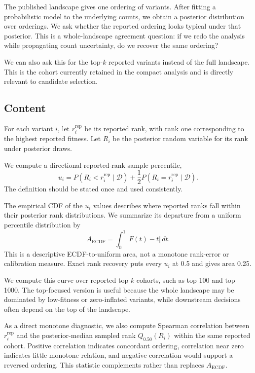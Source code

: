 \documentclass[11pt]{article}
\newcommand{\data}{\mathcal{D}}
\begin{document}
The published landscape gives one ordering of variants. After fitting a probabilistic model to the underlying counts, we obtain a posterior distribution over orderings. We ask whether the reported ordering looks typical under that posterior. This is a whole-landscape agreement question: if we redo the analysis while propagating count uncertainty, do we recover the same ordering?

We can also ask this for the top-$k$ reported variants instead of the full landscape. This is the cohort currently retained in the compact analysis and is directly relevant to candidate selection.

\subsection*{Content}

For each variant $i$, let $r_i^{\mathrm{rep}}$ be its reported rank, with rank one corresponding to the highest reported fitness. Let $R_i$ be the posterior random variable for its rank under posterior draws.

We compute a directional reported-rank sample percentile,
\[
u_i = P(R_i < r_i^{\mathrm{rep}} \mid \data)
+ \frac{1}{2}P(R_i = r_i^{\mathrm{rep}} \mid \data).
\]
The definition should be stated once and used consistently.

The empirical CDF of the $u_i$ values describes where reported ranks fall within their posterior rank distributions. We summarize its departure from a uniform percentile distribution by
\[
A_{\mathrm{ECDF}} =
\int_0^1 |F(t)-t|\,dt.
\]
This is a descriptive ECDF-to-uniform area, not a monotone rank-error or calibration measure. Exact rank recovery puts every $u_i$ at 0.5 and gives area 0.25.

We compute this curve over reported top-$k$ cohorts, such as top 100 and top 1000. The top-focused version is useful because the whole landscape may be dominated by low-fitness or zero-inflated variants, while downstream decisions often depend on the top of the landscape.

As a direct monotone diagnostic, we also compute Spearman correlation between $r_i^{\mathrm{rep}}$ and the posterior-median sampled rank $Q_{0.50}(R_i)$ within the same reported cohort. Positive correlation indicates concordant ordering, correlation near zero indicates little monotone relation, and negative correlation would support a reversed ordering. This statistic complements rather than replaces $A_{\mathrm{ECDF}}$.
\end{document}
